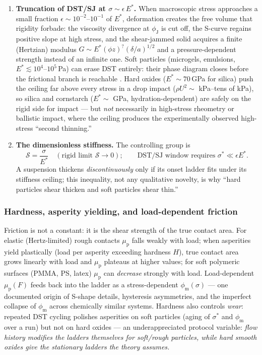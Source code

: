 \documentclass[11pt]{article}
\newcommand{\phiJ}{\phi_{\mathrm{J}}}
\newcommand{\phiM}{\phi_{\mathrm{m}}}
\newcommand{\sigmastar}{\sigma^{*}}
\newcommand{\mup}{\mu_{\mathrm{p}}}
\begin{document}
\begin{enumerate}
\item \textbf{Truncation of DST/SJ at $\sigma \sim \epsilon\,E^{*}$.} When macroscopic stress approaches a small fraction $\epsilon \sim 10^{-2}$--$10^{-1}$ of $E^{*}$, deformation creates the free volume that rigidity forbade: the viscosity divergence at $\phiJ$ is cut off, the S-curve regains positive slope at high stress, and the shear-jammed solid acquires a finite (Hertzian) modulus $G \sim E^{*}(\phi z)^{?}(\delta/a)^{1/2}$ and a pressure-dependent strength instead of an infinite one. Soft particles (microgels, emulsions, $E^{*} \lesssim 10^{4}$--$10^{5}$\,Pa) can erase DST entirely: their phase diagram closes before the frictional branch is reachable \cite{brown2014}. Hard oxides ($E^{*}\sim 70$\,GPa for silica) push the ceiling far above every stress in a drop impact ($\rho U^2 \sim$ kPa--tens of kPa), so silica and cornstarch ($E^{*}\sim$ GPa, hydration-dependent) are safely on the rigid side for impact --- but \emph{not} necessarily in high-stress rheometry or ballistic impact, where the ceiling produces the experimentally observed high-stress ``second thinning.''
\item \textbf{The dimensionless stiffness.} The controlling group is
\begin{equation}
\mathcal{S} = \frac{\sigma}{E^{*}} \quad (\text{rigid limit } \mathcal{S}\to 0);
\qquad \text{DST/SJ window requires } \sigmastar \ll \epsilon E^{*}.
\label{eq:stiffnessgroup}
\end{equation}
A suspension thickens \emph{discontinuously} only if its onset ladder fits under its stiffness ceiling; this inequality, not any qualitative novelty, is why ``hard particles shear thicken and soft particles shear thin.''
\end{enumerate}

\subsubsection{Hardness, asperity yielding, and load-dependent friction}
Friction is not a constant: it is the shear strength of the true contact area. For elastic (Hertz-limited) rough contacts $\mup$ falls weakly with load; when asperities yield plastically (load per asperity exceeding hardness $H$), true contact area grows linearly with load and $\mup$ plateaus at higher values; for soft polymeric surfaces (PMMA, PS, latex) $\mup$ can \emph{decrease} strongly with load. Load-dependent $\mup(F)$ feeds back into the ladder as a stress-dependent $\phiM(\sigma)$ --- one documented origin of S-shape details, hysteresis asymmetries, and the imperfect collapse of $\phiM$ across chemically similar systems. Hardness also controls \emph{wear}: repeated DST cycling polishes asperities on soft particles (aging of $\sigmastar$ and $\phiM$ over a run) but not on hard oxides --- an underappreciated protocol variable: \emph{flow history modifies the ladders themselves for soft/rough particles, while hard smooth oxides give the stationary ladders the theory assumes.}
\end{document}

